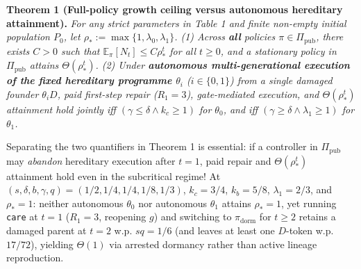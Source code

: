\documentclass[12pt,letterpaper]{article}
\begin{document}
\textbf{Theorem 1 (Full-policy growth ceiling versus autonomous
hereditary attainment).} \emph{For any strict parameters in Table 1 and
finite non-empty initial population \(P_0\), let
\(\rho_* := \max\{1, \lambda_0, \lambda_1\}\). (1) Across \textbf{all}
policies \(\pi \in \Pi_{\mathrm{pub}}\), there exists \(C > 0\) such
that \(\mathbb{E}_\pi[N_t] \le C \rho_*^t\) for all \(t \ge 0\), and a
stationary policy in \(\Pi_{\mathrm{pub}}\) attains
\(\Theta(\rho_*^t)\). (2) Under \textbf{autonomous multi-generational
execution of the fixed hereditary programme \(\theta_i\)}
(\(i \in \{0,1\}\)) from a single damaged founder \(\theta_i D\), paid
first-step repair (\(R_1=3\)), gate-mediated execution, and
\(\Theta(\rho_*^t)\) attainment hold jointly iff
\((\gamma \le \delta \land k_c \ge 1)\) for \(\theta_0\), and iff
\((\gamma \ge \delta \land \lambda_1 \ge 1)\) for \(\theta_1\).}

Separating the two quantifiers in Theorem 1 is essential: if a
controller in \(\Pi_{\mathrm{pub}}\) may \emph{abandon} hereditary
execution after \(t=1\), paid repair and \(\Theta(\rho_*^t)\) attainment
hold even in the subcritical regime! At
\((s,\delta,b,\gamma,q) = (1/2, 1/4, 1/4, 1/8, 1/3)\), \(k_c = 3/4\),
\(k_b = 5/8\), \(\lambda_1 = 2/3\), and \(\rho_* = 1\): neither
autonomous \(\theta_0\) nor autonomous \(\theta_1\) attains
\(\rho_*=1\), yet running \texttt{care} at \(t=1\) (\(R_1=3\), reopening
\(g\)) and switching to \(\pi_{\mathrm{dorm}}\) for \(t \ge 2\) retains
a damaged parent at \(t=2\) w.p. \(sq = 1/6\) (and leaves at least one
\(D\)-token w.p. \(17/72\)), yielding \(\Theta(1)\) via arrested
dormancy rather than active lineage reproduction.
\end{document}
